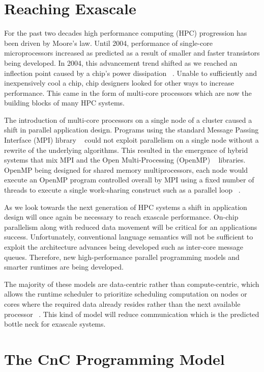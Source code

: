 \documentclass{vgtc}                          %
\begin{document}
\section{Reaching Exascale}

For the past two decades high performance computing (HPC) progression
has been driven by Moore's law. Until 2004, performance of single-core
microprocessors increased as predicted as a result of smaller and
faster transistors being developed. In 2004, this advancement trend
shifted as we reached an inflection point caused by a chip’s power
dissipation ~\cite{kogge2013exascale}. Unable to sufficiently and
inexpensively cool a chip, chip designers looked for other ways to
increase performance. This came in the form of multi-core processors
which are now the building blocks of many HPC systems.

The introduction of multi-core processors on a single node of a
cluster caused a shift in parallel application design. Programs using
the standard Message Passing Interface (MPI) library
~\cite{Snir:1998:MCR:552013} could not exploit parallelism on a single
node without a rewrite of the underlying algorithms. This resulted in
the emergence of hybrid systems that mix MPI and the Open
Multi-Processing (OpenMP) ~\cite{openmp08} libraries. OpenMP being
designed for shared memory multiprocessors, each node would execute an
OpenMP program controlled overall by MPI using a fixed number of
threads to execute a single work-sharing construct such as a parallel
loop ~\cite{gropp2013programming}.

As we look towards the next generation of HPC systems a shift in
application design will once again be necessary to reach exascale
performance. On-chip parallelism along with reduced data movement will
be critical for an applications success. Unfortunately, conventional
language semantics will not be sufficient to exploit the architecture
advances being developed such as inter-core message queues. Therefore,
new high-performance parallel programming models and smarter runtimes
are being developed.

The majority of these models are data-centric rather than
compute-centric, which allows the runtime scheduler to prioritize
scheduling computation on nodes or cores where the required data
already resides rather than the next available processor
~\cite{kogge2013exascale}. This kind of model will reduce
communication which is the predicted bottle neck for exascale systems.

\section{The CnC Programming Model}
\end{document}
